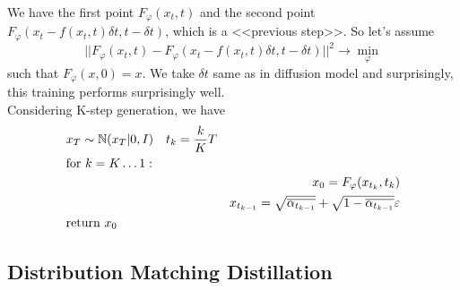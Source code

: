 We have the first point $F_{\varphi} (x_t, t)$ and the second point $F_\varphi(x_t - f(x_t, t)\delta t, t - \delta t)$, which is a <<previous step>>. So let's assume 
\[ 
    || F_{\varphi} (x_t, t) - F_\varphi(x_t - f(x_t, t)\delta t, t - \delta t) ||^2 \to \min_{\varphi}
\]
such that $F_{\varphi}(x, 0) = x$. We take $\delta t$ same as in diffusion model and surprisingly, this training performs surprisingly well. \\ 

Considering K-step generation, we have
\begin{equation*}
    \begin{aligned}
        &x_T \sim \operatorname{\mathbb{N}}(x_T | 0, I) \quad t_k = \frac{k}{K} T \\ 
        &\text{for } k = K \ldots 1: \\ 
        & \quad &x_0 = F_{\varphi}(x_{t_k}, t_k) \\
        & \quad &x_{t_{k-1}} = \sqrt{\overline{\alpha_{t_{k-1}}}} + \sqrt{1 - \overline{\alpha_{t_{k-1}}}} \varepsilon \\
        &\text{return } x_0
    \end{aligned}
\end{equation*}

\subsection{Distribution Matching Distillation}


